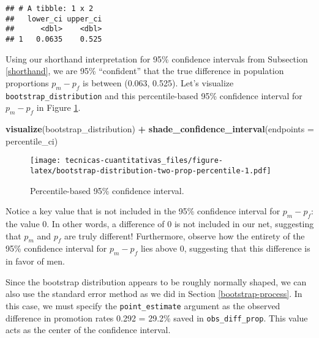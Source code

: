 \documentclass[
]{book}
\newenvironment{Shaded}{\begin{snugshade}}{\end{snugshade}}
\newcommand{\DataTypeTok}[1]{\textcolor[rgb]{0.13,0.29,0.53}{#1}}
\newcommand{\FloatTok}[1]{\textcolor[rgb]{0.00,0.00,0.81}{#1}}
\newcommand{\KeywordTok}[1]{\textcolor[rgb]{0.13,0.29,0.53}{\textbf{#1}}}
\newcommand{\NormalTok}[1]{#1}
\newcommand{\OperatorTok}[1]{\textcolor[rgb]{0.81,0.36,0.00}{\textbf{#1}}}
\newcommand{\StringTok}[1]{\textcolor[rgb]{0.31,0.60,0.02}{#1}}
\begin{document}
\begin{verbatim}
## # A tibble: 1 x 2
##   lower_ci upper_ci
##      <dbl>    <dbl>
## 1   0.0635    0.525
\end{verbatim}

Using our shorthand interpretation for 95\% confidence intervals from Subsection \ref{shorthand}, we are 95\% ``confident'' that the true difference in population proportions \(p_{m} - p_{f}\) is between (0.063, 0.525). Let's visualize \texttt{bootstrap\_distribution} and this percentile-based 95\% confidence interval for \(p_{m} - p_{f}\) in Figure \ref{fig:bootstrap-distribution-two-prop-percentile}.

\begin{Shaded}
\begin{Highlighting}[]
\KeywordTok{visualize}\NormalTok{(bootstrap_distribution) }\OperatorTok{+}\StringTok{ }
\StringTok{  }\KeywordTok{shade_confidence_interval}\NormalTok{(}\DataTypeTok{endpoints =}\NormalTok{ percentile_ci)}
\end{Highlighting}
\end{Shaded}

\begin{figure}
\centering
\texttt{[image: tecnicas-cuantitativas\_files/figure-latex/bootstrap-distribution-two-prop-percentile-1.pdf]}
\caption{\label{fig:bootstrap-distribution-two-prop-percentile}Percentile-based 95\% confidence interval.}
\end{figure}

Notice a key value that is not included in the 95\% confidence interval for \(p_{m} - p_{f}\): the value 0. In other words, a difference of 0 is not included in our net, suggesting that \(p_{m}\) and \(p_{f}\) are truly different! Furthermore, observe how the entirety of the 95\% confidence interval for \(p_{m} - p_{f}\) lies above 0, suggesting that this difference is in favor of men.

Since the bootstrap distribution appears to be roughly normally shaped, we can also use the standard error method as we did in Section \ref{bootstrap-process}. In this case, we must specify the \texttt{point\_estimate} argument as the observed difference in promotion rates 0.292 = 29.2\% saved in \texttt{obs\_diff\_prop}. This value acts as the center of the confidence interval.

\begin{Shaded}
\end{Shaded}
\end{document}
